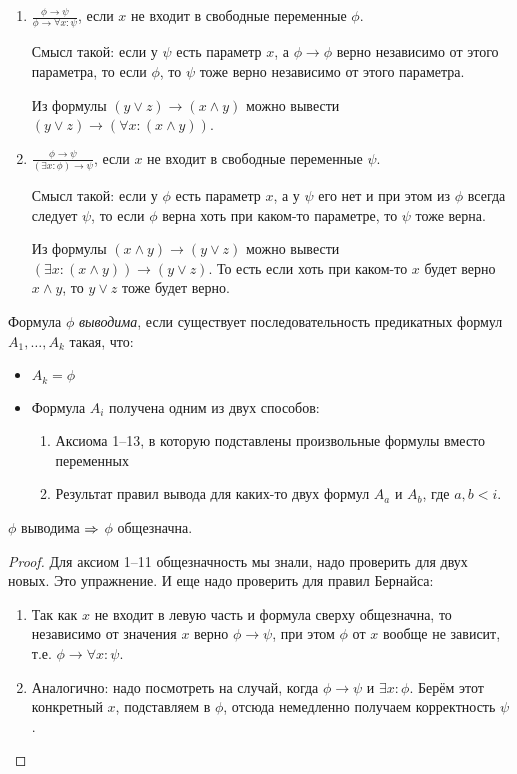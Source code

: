 \begin{enumerate}
	\item
		$\frac{\phi \to \psi}{\phi \to \forall x \colon \psi}$, если $x$ не входит в свободные переменные $\phi$.

		Смысл такой: если у $\psi$ есть параметр $x$, а $\phi \to \phi$ верно независимо от этого параметра, то
		если $\phi$, то $\psi$ тоже верно независимо от этого параметра.
		\begin{exmp}
			Из формулы $(y \lor z) \to (x \land y)$ можно вывести $(y \lor z) \to (\forall x \colon (x \land y))$.
		\end{exmp}

	\item
		$\frac{\phi \to \psi}{(\exists x \colon \phi) \to \psi}$, если $x$ не входит в свободные переменные $\psi$.

		Смысл такой: если у $\phi$ есть параметр $x$, а у $\psi$ его нет и при этом из $\phi$ всегда следует $\psi$,
		то если $\phi$ верна хоть при каком-то параметре, то $\psi$ тоже верна.
		\begin{exmp}
			Из формулы $(x \land y) \to (y \lor z)$ можно вывести $(\exists x \colon (x \land y)) \to (y \lor z)$.
			То есть если хоть при каком-то $x$ будет верно $x \land y$, то $y \lor z$ тоже будет верно.
		\end{exmp}
\end{enumerate}

\begin{Def}
	Формула $\phi$ \textit{выводима}, если существует последовательность предикатных формул $A_1, \dots, A_k$ такая, что:
	\begin{itemize}
	\item $A_k = \phi$
	\item Формула $A_i$ получена одним из двух способов:	
		\begin{enumerate}
		\item Аксиома 1--13, в которую подставлены произвольные формулы вместо переменных
		\item Результат правил вывода для каких-то двух формул $A_a$ и $A_b$, где $a, b < i$.
		\end{enumerate}
	\end{itemize}
\end{Def}
\begin{theorem}[о корректности]
	$\phi$ выводима $\Rightarrow$ $\phi$ общезначна.
\end{theorem}
\begin{proof}
	Для аксиом 1--11 общезначность мы знали, надо проверить для двух новых.
	Это упражнение.
	И еще надо проверить для правил Бернайса:
	\begin{enumerate}
		\item
			Так как $x$ не входит в левую часть и формула сверху общезначна,
			то независимо от значения $x$ верно $\phi \to \psi$, при этом $\phi$ от $x$ вообще не зависит,
			т.е. $\phi \to \forall x \colon \psi$.
		\item
			Аналогично: надо посмотреть на случай, когда $\phi \to \psi$ и $\exists x \colon \phi$.
			Берём этот конкретный $x$, подставляем в $\phi$, отсюда немедленно получаем корректность $\psi$.
	\end{enumerate}
\end{proof}

